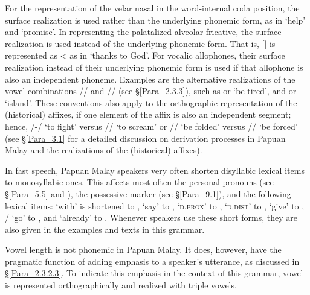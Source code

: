 For the representation of the velar nasal in the word-internal coda position, the surface realization is used rather than the underlying phonemic form, as in  ‘help’ and  ‘promise’. In representing the palatalized alveolar fricative, the surface realization is used instead of the underlying phonemic form. That is, [] is represented as {\textless} as in  ‘thanks to God’. For vocalic allophones, their surface realization instead of their underlying phonemic form is used if that allophone is also an independent phoneme. Examples are the alternative realizations of the vowel combinations // and // (see §\ref{Para_2.3.3}), such as  or  ‘be tired’, and  or  ‘island’. These conventions also apply to the orthographic representation of the (historical) affixes, if one element of the affix is also an independent segment; hence,  /\textsc{-}/ ‘to fight’ versus  // ‘to scream’ or  // ‘be folded’ versus  // ‘be forced’ (see §\ref{Para_3.1} for a detailed discussion on derivation processes in Papuan Malay and the realizations of the (historical) affixes).



In fast speech, Papuan Malay speakers very often shorten disyllabic lexical items to monosyllabic ones. This affects most often the personal pronouns (see §\ref{Para_5.5} and ), the possessive marker (see §\ref{Para_9.1}), and the following lexical items:  ‘with’ is shortened to ,  ‘say’ to ,  ‘\textsc{d.prox}’ to ,  ‘\textsc{d.dist}’ to ,  ‘give’ to , / ‘go’ to , and  ‘already’ to . Whenever speakers use these short forms, they are also given in the examples and texts in this grammar.



Vowel length is not phonemic in Papuan Malay. It does, however, have the pragmatic function of adding emphasis to a speaker’s utterance, as discussed in §\ref{Para_2.3.2.3}. To indicate this emphasis in the context of this grammar, vowel  is represented orthographically and realized with triple vowels.


